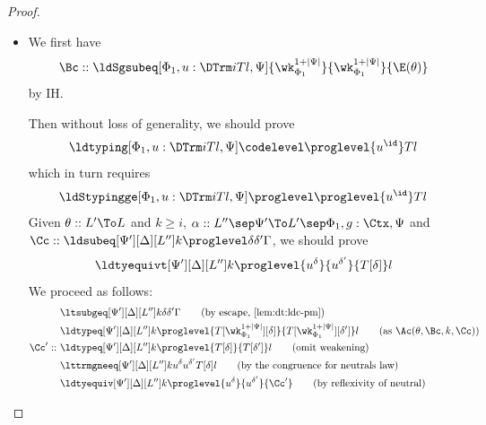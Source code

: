 \begin{proof}
\begin{itemize}[label=Case]
\begin{itemize}[label=Subcase]
    \item If $i = \codelevel$, then we know $\ldsubst[\Psi] \codelevel \proglevel{\id}\Gamma$. %
      Combining the previous case, we have the goal.
    \end{itemize}
  \item
    We first have
    \[
      \Bc :: \ldSgsubeq[\Phi_1,u : \DTrm i T l,\Psi]{\wk_{\Phi_1}^{1 + |\Psi|}}{\wk_{\Phi_1}^{1 +
          |\Psi|}}{\E(\theta)}
    \]
    by IH.

    Then without loss of generality, we should prove
    \[
      \ldtyping[\Phi_1,u : \DTrm i T l,\Psi] \codelevel \proglevel{u^\id}T l
    \]
    which in turn requires
    \[
      \ldStypingge[\Phi_1,u : \DTrm i T l,\Psi] \proglevel \proglevel{u^\id}T l
    \]
    Given $\theta :: L' \To L$ and $k \ge i$,  $\alpha :: L'' \sep \Psi' \To L'
    \sep \Phi_1,g:\Ctx,\Psi$ and
    $\Cc :: \ldsubeq[\Psi'][\Delta][L''] k \proglevel \delta{\delta'}{\Gamma}$, we should
    prove
    \[
      \ldtyequivt[\Psi'][\Delta][L''] k \proglevel{u^\delta}{u^{\delta'}}{T[\delta]} l
    \]
    We proceed as follows:
    \begin{align*}
      & \ltsubgeq[\Psi'][\Delta][L''] k \delta{\delta'}{\Gamma}
        \tag{by escape, \Cref{lem:dt:ldc-pm}} \\
      & \ldtypeq[\Psi'][\Delta][L''] k \proglevel{T[\wk_{\Phi_1}^{1 +
        |\Psi|}][\delta]}{T[\wk_{\Phi_1}^{1 + |\Psi|}][\delta']}l
        \tag{as $\Ac(\theta, \Bc, k, \Cc)$} \\
      \Cc' ::~& \ldtypeq[\Psi'][\Delta][L''] k \proglevel{T[\delta]}{T[\delta']}l
                \tag{omit weakening}\\
      & \lttrmgneeq[\Psi'][\Delta][L''] k{u^\delta}{u^{\delta'}}{T[\delta]} l
        \tag{by the congruence for neutrals law} \\
      & \ldtyequiv[\Psi'][\Delta][L''] k \proglevel{u^\delta}{u^{\delta'}}{\Cc'}
        \tag{by reflexivity of neutral}
    \end{align*}
  \end{itemize}
\end{proof}

